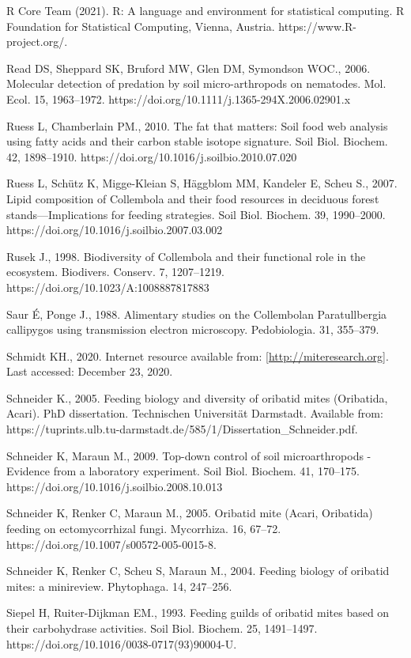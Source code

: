 \documentclass[11pt]{article}
\begin{document}
R Core Team (2021). R: A language and environment for statistical
computing. R Foundation for Statistical Computing, Vienna, Austria.
https://www.R-project.org/.

Read DS, Sheppard SK, Bruford MW, Glen DM, Symondson WOC., 2006.
Molecular detection of predation by soil micro-arthropods on nematodes.
Mol. Ecol. 15, 1963--1972.
https://doi.org/10.1111/j.1365-294X.2006.02901.x

Ruess L, Chamberlain PM., 2010. The fat that matters: Soil food web
analysis using fatty acids and their carbon stable isotope signature.
Soil Biol. Biochem. 42, 1898--1910.
https://doi.org/10.1016/j.soilbio.2010.07.020

Ruess L, Schütz K, Migge-Kleian S, Häggblom MM, Kandeler E, Scheu S.,
2007. Lipid composition of Collembola and their food resources in
deciduous forest stands---Implications for feeding strategies. Soil
Biol. Biochem. 39, 1990--2000.
https://doi.org/10.1016/j.soilbio.2007.03.002

Rusek J., 1998. Biodiversity of Collembola and their functional role in
the ecosystem. Biodivers. Conserv. 7, 1207--1219.
https://doi.org/10.1023/A:1008887817883

Saur É, Ponge J., 1988. Alimentary studies on the Collembolan
Paratullbergia callipygos using transmission electron microscopy.
Pedobiologia. 31, 355--379.

Schmidt KH., 2020. Internet resource available from:
\href{http://miteresearch.org/}{{[}http://miteresearch.org{]}}. Last
accessed: December 23, 2020.

Schneider K., 2005. Feeding biology and diversity of oribatid mites
(Oribatida, Acari). PhD dissertation. Technischen Universität Darmstadt.
Available from:
https://tuprints.ulb.tu-darmstadt.de/585/1/Dissertation\_Schneider.pdf.

Schneider K, Maraun M., 2009. Top-down control of soil microarthropods -
Evidence from a laboratory experiment. Soil Biol. Biochem. 41, 170--175.
https://doi.org/10.1016/j.soilbio.2008.10.013

Schneider K, Renker C, Maraun M., 2005. Oribatid mite (Acari, Oribatida)
feeding on ectomycorrhizal fungi. Mycorrhiza. 16, 67--72.
https://doi.org/10.1007/s00572-005-0015-8.

Schneider K, Renker C, Scheu S, Maraun M., 2004. Feeding biology of
oribatid mites: a minireview. Phytophaga. 14, 247--256.

Siepel H, Ruiter-Dijkman EM., 1993. Feeding guilds of oribatid mites
based on their carbohydrase activities. Soil Biol. Biochem. 25,
1491--1497. https://doi.org/10.1016/0038-0717(93)90004-U.
\end{document}

